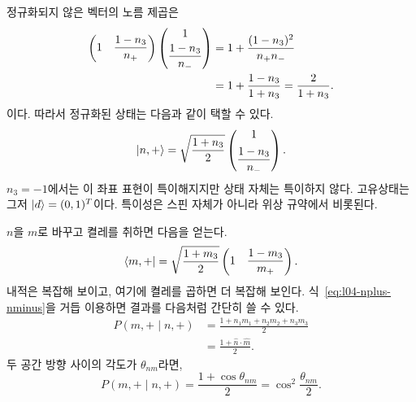 정규화되지 않은 벡터의 노름 제곱은
\begin{align}
  \begin{pmatrix}
    1&\dfrac{1-n_3}{n_+}
  \end{pmatrix}
  \begin{pmatrix}
    1\\[3pt]\dfrac{1-n_3}{n_-}
  \end{pmatrix}
  &=
  1+\frac{(1-n_3)^2}{n_+n_-}
  \notag\\
  &=
  1+\frac{1-n_3}{1+n_3}
  =
  \frac{2}{1+n_3}.
  \label{eq:l04-unnormalized-norm}
\end{align}
이다. 따라서 정규화된 상태는 다음과 같이 택할 수 있다.
\begin{equation}
  \left\lvert n,+\right\rangle
  =
  \sqrt{\frac{1+n_3}{2}}
  \begin{pmatrix}
    1\\[5pt]\dfrac{1-n_3}{n_-}
  \end{pmatrix}.
  \label{eq:l04-normalized-n-state}
\end{equation}
\(n_3=-1\)에서는 이 좌표 표현이 특이해지지만 상태 자체는 특이하지 않다. 고유상태는 그저 \(\left\lvert d\right\rangle=(0,1)^T\)이다. 특이성은 스핀 자체가 아니라 위상 규약에서 비롯된다.

\(n\)을 \(m\)로 바꾸고 켤레를 취하면 다음을 얻는다.
\begin{equation}
  \left\langle m,+\right\rvert
  =
  \sqrt{\frac{1+m_3}{2}}
  \begin{pmatrix}
    1&
    \dfrac{1-m_3}{m_+}
  \end{pmatrix}.
\end{equation}
내적은 복잡해 보이고, 여기에 켤레를 곱하면 더 복잡해 보인다. 식~\eqref{eq:l04-nplus-nminus}을 거듭 이용하면 결과를 다음처럼 간단히 쓸 수 있다.
\begin{equation}
  \begin{aligned}
    P(m,+\mid n,+)
    &=\frac{1+n_1m_1+n_2m_2+n_3m_3}{2}\\
    &=\frac{1+\hat n\cdot\hat m}{2}.
  \end{aligned}
  \label{eq:l04-spin-transition-probability}
\end{equation}
두 공간 방향 사이의 각도가 \(\theta_{nm}\)라면,
\begin{equation}
  P(m,+\mid n,+)
  =
  \frac{1+\cos\theta_{nm}}{2}
  =
  \cos^2\frac{\theta_{nm}}{2}.
  \label{eq:l04-half-angle-probability}
\end{equation}

\begin{classroomqa}
\end{classroomqa}

